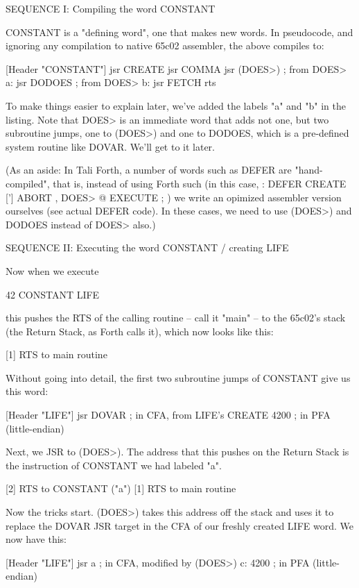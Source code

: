 SEQUENCE I: Compiling the word CONSTANT 

CONSTANT is a "defining word", one that makes new words. In pseudocode, and
ignoring any compilation to native 65c02 assembler, the above compiles to: 

        [Header "CONSTANT"] 
        jsr CREATE
        jsr COMMA
        jsr (DOES>)         ; from DOES>
   a:   jsr DODOES          ; from DOES>
   b:   jsr FETCH
        rts

To make things easier to explain later, we've added the labels "a" and "b" in
the listing. Note that DOES> is an immediate word that adds not one, but two
subroutine jumps, one to (DOES>) and one to DODOES, which is a pre-defined
system routine like DOVAR. We'll get to it later.

(As an aside: In Tali Forth, a number of words such as DEFER are
"hand-compiled", that is, instead of using Forth such (in this case, : DEFER
CREATE ['] ABORT , DOES> @ EXECUTE ; ) we write an opimized assembler version
ourselves (see actual DEFER code). In these cases, we need to use (DOES>) and
DODOES instead of DOES> also.)


SEQUENCE II: Executing the word CONSTANT / creating LIFE 

Now when we execute

        42 CONSTANT LIFE

this pushes the RTS of the calling routine -- call it "main" -- to the 65c02's
stack (the Return Stack, as Forth calls it), which now looks like this:

        [1] RTS to main routine 

Without going into detail, the first two subroutine jumps of CONSTANT give us
this word: 

        [Header "LIFE"]
        jsr DOVAR               ; in CFA, from LIFE's CREATE
        4200                    ; in PFA (little-endian)

Next, we JSR to (DOES>). The address that this pushes on the Return Stack is
the instruction of CONSTANT we had labeled "a". 

        [2] RTS to CONSTANT ("a") 
        [1] RTS to main routine 

Now the tricks start. (DOES>) takes this address off the stack and uses it to
replace the DOVAR JSR target in the CFA of our freshly created LIFE word. We
now have this: 

        [Header "LIFE"]         
        jsr a                   ; in CFA, modified by (DOES>)
   c:   4200                    ; in PFA (little-endian)

